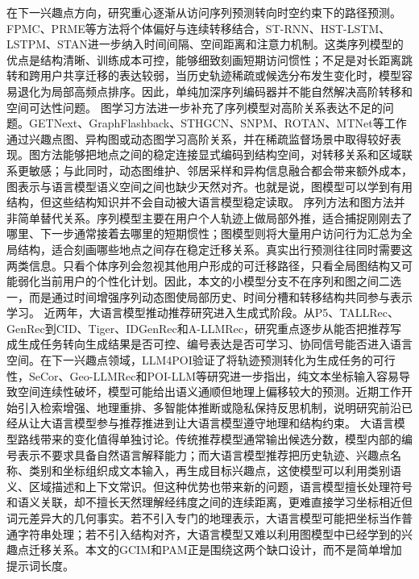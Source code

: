 在下一兴趣点方向，研究重心逐渐从访问序列预测转向时空约束下的路径预测。FPMC\cite{FPMC}、PRME\cite{PRME}等方法将个体偏好与连续转移结合，ST-RNN\cite{ST-RNN}、HST-LSTM\cite{HST-LSTM}、LSTPM\cite{LSTPM}、STAN\cite{STAN}进一步纳入时间间隔、空间距离和注意力机制。这类序列模型的优点是结构清晰、训练成本可控，能够细致刻画短期访问惯性；不足是对长距离跳转和跨用户共享迁移的表达较弱，当历史轨迹稀疏或候选分布发生变化时，模型容易退化为局部高频点排序。因此，单纯加深序列编码器并不能自然解决高阶转移和空间可达性问题。
图学习方法进一步补充了序列模型对高阶关系表达不足的问题。GETNext\cite{GETNext}、GraphFlashback\cite{GraphFlashback}、STHGCN\cite{STHGCN}、SNPM\cite{SNPM}、ROTAN\cite{ROTAN}、MTNet\cite{MTNet}等工作通过兴趣点图、异构图或动态图学习高阶关系，并在稀疏监督场景中取得较好表现。图方法能够把地点之间的稳定连接显式编码到结构空间，对转移关系和区域联系更敏感；与此同时，动态图维护、邻居采样和异构信息融合都会带来额外成本，图表示与语言模型语义空间之间也缺少天然对齐。也就是说，图模型可以学到有用结构，但这些结构知识并不会自动被大语言模型稳定读取。
序列方法和图方法并非简单替代关系。序列模型主要在用户个人轨迹上做局部外推，适合捕捉刚刚去了哪里、下一步通常接着去哪里的短期惯性；图模型则将大量用户访问行为汇总为全局结构，适合刻画哪些地点之间存在稳定迁移关系。真实出行预测往往同时需要这两类信息。只看个体序列会忽视其他用户形成的可迁移路径，只看全局图结构又可能弱化当前用户的个性化计划。因此，本文的小模型分支不在序列和图之间二选一，而是通过时间增强序列动态图使局部历史、时间分槽和转移结构共同参与表示学习。
近两年，大语言模型推动推荐研究进入生成式阶段。从P5\cite{p5recsys2022}、TALLRec\cite{tallrec2023}、GenRec\cite{genrec2023}到CID\cite{cid2023}、Tiger\cite{tiger2023neurips}、IDGenRec\cite{idgenrec2024sigir}和A-LLMRec\cite{allmrec2024kdd}，研究重点逐步从能否把推荐写成生成任务转向生成结果是否可控、编号表达是否可学习、协同信号能否进入语言空间。在下一兴趣点领域，LLM4POI\cite{LLM4POI}验证了将轨迹预测转化为生成任务的可行性，SeCor\cite{SeCor}、Geo-LLMRec\cite{wang2024georecllm}和POI-LLM\cite{zheng2024poillm}等研究进一步指出，纯文本坐标输入容易导致空间连续性破坏，模型可能给出语义通顺但地理上偏移较大的预测。近期工作开始引入检索增强、地理重排、多智能体推断或隐私保持反思机制\cite{wu2024mrpllm,wu2024mas4poi,li2025rallmpoi}，说明研究前沿已经从让大语言模型参与推荐推进到让大语言模型遵守地理和结构约束。
大语言模型路线带来的变化值得单独讨论。传统推荐模型通常输出候选分数，模型内部的编号表示不要求具备自然语言解释能力；而大语言模型推荐把历史轨迹、兴趣点名称、类别和坐标组织成文本输入，再生成目标兴趣点，这使模型可以利用类别语义、区域描述和上下文常识。但这种优势也带来新的问题，语言模型擅长处理符号和语义关联，却不擅长天然理解经纬度之间的连续距离，更难直接学习坐标相近但词元差异大的几何事实。若不引入专门的地理表示，大语言模型可能把坐标当作普通字符串处理；若不引入结构对齐，大语言模型又难以利用图模型中已经学到的兴趣点迁移关系。本文的GCIM和PAM正是围绕这两个缺口设计，而不是简单增加提示词长度。
